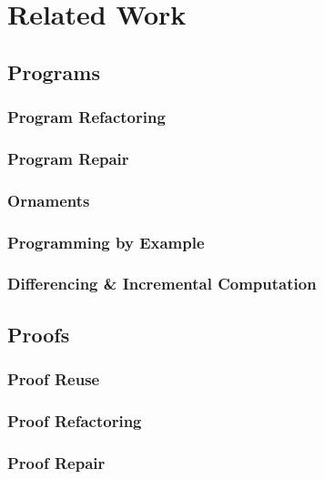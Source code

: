 \chapter{Related Work}


\section{Programs}

\subsection*{Program Refactoring} 

\subsection*{Program Repair} 

\subsection*{Ornaments}

\subsection*{Programming by Example}

\subsection*{Differencing \& Incremental Computation}

\section{Proofs}

\subsection*{Proof Reuse}

\subsection*{Proof Refactoring}

\subsection*{Proof Repair}

